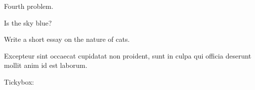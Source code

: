 \documentclass{nmd-exam}
\begin{document}
\begin{problems}
\begin{subproblems}
        
      \end{subproblems}


    \item Fourth problem.
      \begin{subproblems}
      \item Is the sky blue?  \quad \truefalse

      \item Write a short essay on the nature of cats.

        \vfill

      \item Excepteur sint occaecat cupidatat non proident, sunt in
        culpa qui officia deserunt mollit anim id est laborum.

        \vspace{4cm}

        \hfill Tickybox: \quad \checkbox
      \end{subproblems}
    \end{problems}
\end{document}
